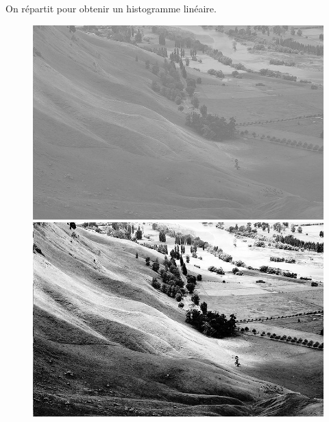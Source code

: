 \documentclass[french]{article}
\begin{document}
On répartit pour obtenir un histogramme linéaire.

\begin{figure}[h]
\begin{center}
{\includegraphics[scale=0.16]{images/histo01.jpg}\includegraphics[scale=0.16]{images/histo03.jpg}} 
\end{center}
\begin{center}

\end{center}
\end{figure}
\end{document}
